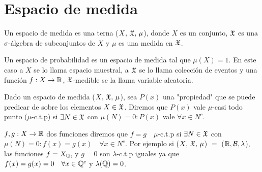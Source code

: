 \section{Espacio de medida}

\begin{definition}
    Un espacio de medida es una terna ($X\text{, } \mathfrak{X}\text{, } \mu$), donde $X$ es un conjunto, $\mathfrak{X}$ es una $\sigma$-álgebra de subconjuntos de $X$ y $\mu$ es una medida en $\mathfrak{X}$.
\end{definition}

Un espacio de probabilidad es un espacio de medida tal que $\mu(X) = 1$.
En este caso a $X$ se lo llama espacio muestral, a $\mathfrak{X}$ se lo llama colección de eventos y
una función $f: X \to \mathbb{R}$, $\mathfrak{X}$-medible se la llama variable aleatoria.

\begin{definition}
    Dado un espacio de medida ($X\text{, } \mathfrak{X}\text{, } \mu$), sea $P(x)$ una "propiedad" que se puede predicar de sobre los elementos $X \in \mathfrak{X}$.
    Diremos que $P(x)$ vale $\mu$-casi todo punto ($\mu$-c.t.p) si $\exists N \in \mathfrak{X}$ con $\mu(N) = 0 : P(x)$ vale $\forall x \in N^c$.
\end{definition}

\begin{eg}
    $f, g : X \to \mathbb{R}$ dos funciones diremos que $f = g \quad \mu$-c.t.p si $\exists N \in \mathfrak{X}$ con $\mu(N) = 0 : f(x) = g(x) \quad \forall x \in N^c$.
    Por ejemplo si ($X\text{, } \mathfrak{X}\text{, } \mu$) $=$ ($\mathbb{R}, \mathcal{B}, \lambda $), las funciones $f = X_{\mathbb{Q}}$, y $g = 0$ son $\lambda$-c.t.p iguales ya que
    $f(x) = g(x) = 0 \quad \forall x \in \mathbb{Q}^c$ y $\lambda(\mathbb{Q}) = 0$.
\end{eg}

